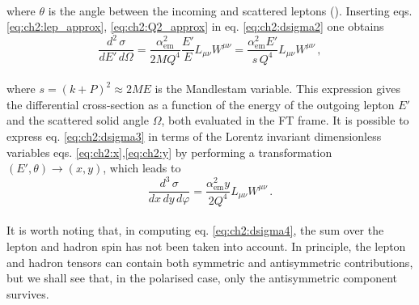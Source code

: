 \\
where $\theta$ is the angle between the incoming and scattered leptons (). Inserting eqs. \eqref{eq:ch2:lep_approx}, \eqref{eq:ch2:Q2_approx} in eq. \eqref{eq:ch2:dsigma2} one obtains 
\\
\begin{equation}
    \frac{d^2\,\sigma}{dE' \, d\Omega} = \frac{\alpha_{\textrm{em}}^2}{2MQ^4} \frac{E'}{E} L_{\mu\nu}W^{\mu\nu} = \frac{\alpha_{\textrm{em}}^2 E'}{s\, Q^4} L_{\mu\nu}W^{\mu\nu}\,,
    \label{eq:ch2:dsigma3}
\end{equation}
\\
where $s = (k + P)^2 \approx 2 M E$ is the Mandlestam variable. This expression gives the differential cross-section as a function of the energy of the outgoing lepton $E'$ and the scattered solid angle $\Omega$, both evaluated in the FT frame. It is possible to express eq. \eqref{eq:ch2:dsigma3} in terms of the Lorentz invariant dimensionless variables eqs. \eqref{eq:ch2:x},\eqref{eq:ch2:y} by performing a transformation $(E', \theta) \rightarrow (x,y)$, which leads to
\\
\begin{equation}
    \frac{d^3 \, \sigma}{dx \, dy \, d\varphi} = \frac{\alpha_{\textrm{em}}^2 y}{2 Q^4} L_{\mu\nu} W^{\mu\nu} \,.
    \label{eq:ch2:dsigma4}
\end{equation}
\\
It is worth noting that, in computing eq. \eqref{eq:ch2:dsigma4}, the sum over the lepton and hadron spin has not been taken into account. In principle, the lepton and hadron tensors can contain both symmetric and antisymmetric contributions, but we shall see that, in the polarised case, only the antisymmetric component survives.

